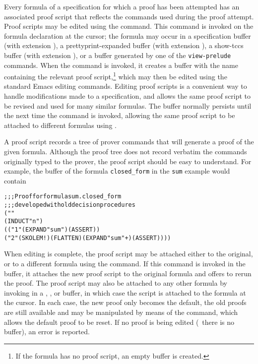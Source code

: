 Every formula of a specification for which a proof has been attempted has
an associated proof script that reflects the commands used during the
proof attempt.  Proof scripts may be edited using the 
command.  This command is invoked on the formula declaration at the
cursor; the formula may occur in a specification buffer (with extension
), a prettyprint-expanded buffer (with extension ),
a show-tccs buffer (with extension ), or a buffer generated by
one of the \texttt{view-prelude} commands.  When the 
command is invoked, it creates a buffer with the name 
containing the relevant proof script,\footnote{If the formula has no proof
script, an empty  buffer is created.}  which may then be
edited using the standard Emacs editing commands.  Editing proof scripts
is a convenient way to handle modifications made to a specification, and
allows the same proof script to be revised and used for many similar
formulas.  The  buffer normally persists until the next time
the  command is invoked, allowing the same proof script to
be attached to different formulas using .

A proof script records a tree of prover commands that will generate a
proof of the given formula.  Although the proof tree does not record
verbatim the commands originally typed to the prover, the proof script
should be easy to understand.  For example, the  buffer of
the formula \texttt{closed\_form} in the \texttt{sum} example would
contain

{\small\small
\begin{alltt}
  ;;; Proof for formula sum.closed_form
  ;;; developed with old decision procedures
  (""
   (INDUCT "n")
   (("1" (EXPAND "sum") (ASSERT))
    ("2" (SKOLEM!) (FLATTEN) (EXPAND "sum" +) (ASSERT))))
\end{alltt}}

When editing is complete, the proof script may be attached either to the
original, or to a different formula using the  command.
If this command is invoked in the  buffer, it attaches the new
proof script to the original formula and offers to rerun the proof.  The
proof script may also be attached to any other formula by invoking
 in a , , or  buffer,
in which case the script is attached to the formula at the cursor.  In
each case, the new proof only becomes the default, the old proofs are
still available and may be manipulated by means of the
 command, which allows the default proof to be
reset.  If no proof is being edited (\ie\ there is no 
buffer), an error is reported.


